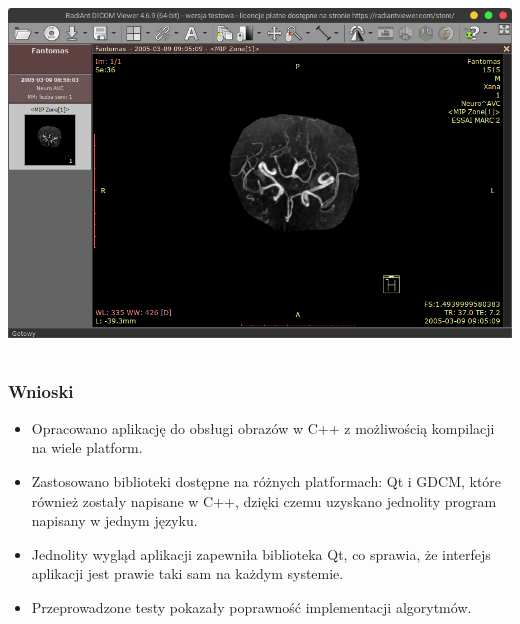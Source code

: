 \documentclass[aspectratio=169]{beamer}
\begin{document}
\begin{frame}[t]
\begin{columns}[T]
        \includegraphics[width=\textwidth]{img/test002.png}
    \end{columns}

\end{frame}

\begin{frame}
    \frametitle{Wnioski}
    \begin{itemize}
        \item Opracowano aplikację do obsługi obrazów \DICOM w C++ z możliwością kompilacji na wiele platform.
        \item Zastosowano biblioteki dostępne na różnych platformach: Qt i GDCM, które również zostały napisane w C++, dzięki czemu uzyskano jednolity program napisany w jednym języku.
        \item Jednolity wygląd aplikacji zapewniła biblioteka Qt, co sprawia, że interfejs aplikacji jest prawie taki sam na każdym systemie.
        \item Przeprowadzone testy pokazały poprawność implementacji algorytmów.
    \end{itemize}

\end{frame}
\end{document}
